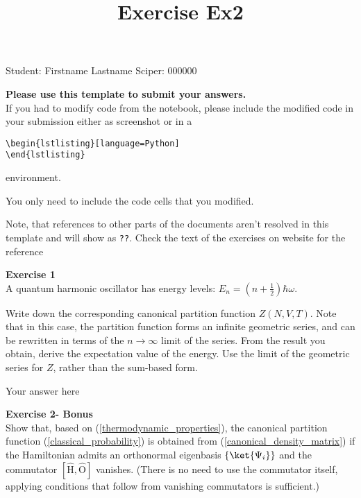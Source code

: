 \documentclass{article}
\title{Exercise Ex2}
\begin{document}
\maketitle\maketitle

Student:  Firstname Lastname    Sciper: 000000

\begin{mdframed}
\textbf{Please use this template to submit your answers.}\\
If you had to modify code from the notebook, please include the modified code in your submission either as screenshot or in a

\begin{verbatim}
\begin{lstlisting}[language=Python]
\end{lstlisting}
\end{verbatim}

environment.

You only need to include the code cells that you modified.

Note, that references to other parts of the documents aren't resolved in this template and will show as \texttt{??}. Check the text of the exercises on website for the reference
\end{mdframed}

\begin{mdframed}
\textbf{Exercise 1}\\
A quantum harmonic oscillator has energy levels: $E_n = \left(n + \frac{1}{2}\right)\hbar \omega$.\newline

Write down the corresponding canonical partition function
$Z(N,V,T)$.  Note that in this case, the partition function forms an
infinite geometric series, and can be rewritten in terms of the
$n \rightarrow \infty$ limit of the series.
From the result you obtain, derive the expectation value of the energy.
Use the limit of the geometric series for $Z$, rather than the sum-based form.
\end{mdframed}

Your answer here

\begin{mdframed}
\textbf{Exercise 2- Bonus}\\
Show that, based on (\ref{thermodynamic_properties}), the canonical partition function (\ref{classical_probability}) is obtained from (\ref{canonical_density_matrix}) if the Hamiltonian admits an orthonormal eigenbasis $\left\{\ket{\Psi_i}\right\}$ and the commutator $\left[\hat{\mathrm{H}},\hat{\mathrm{O}}\right]$ vanishes. (There is no need to use the commutator itself, applying conditions that follow from vanishing commutators is sufficient.)
\end{mdframed}
\end{document}

